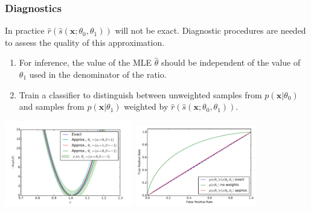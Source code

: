 \documentclass{beamer}
\begin{document}
\begin{frame}
    \frametitle{Diagnostics}

    In practice $\hat{r}(\hat{s}(\mathbf{x}; \theta_0, \theta_1))$ will not be exact.  Diagnostic procedures are needed to assess the quality of this approximation.

    \begin{enumerate}
        \item For inference, the value of the MLE $\hat{\theta}$ should be independent of the value of $\theta_1$ used in the denominator of the ratio.
        \item Train a classifier to distinguish between unweighted samples from $p(\mathbf{x}|\theta_0)$ and samples from $p(\mathbf{x}|\theta_1)$ weighted by $\hat{r}(\hat{s}(\mathbf{x}; \theta_0, \theta_1))$.
    \end{enumerate}

    \vspace{-2em}

    \begin{center}
            \includegraphics[clip, trim=0.3cm 0.3cm 0.3cm 0.3cm,height=10.075em]{figures/likelihood_comp_2.pdf}
            \includegraphics[clip, trim=0.3cm 0.3cm 0.3cm 0.3cm,height=9.5em]{figures/ROC_comp2.pdf}
    \end{center}

\end{frame}
\end{document}
